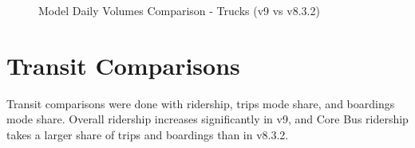 \documentclass[
  letterpaper,
  DIV=11,
  numbers=noendperiod]{scrreprt}
\begin{document}
\begin{figure}
\begin{minipage}[t]{0.33\linewidth}
{{}

}

\end{minipage}%
%
\begin{minipage}[t]{0.33\linewidth}

{\centering 


}

\end{minipage}%

\caption{\label{fig-pdf-volume-truck-comparison}Model Daily Volumes
Comparison - Trucks (v9 vs v8.3.2)}

\end{figure}

\hypertarget{transit-comparisons}{%
\section{Transit Comparisons}\label{transit-comparisons}}

Transit comparisons were done with ridership, trips mode share, and
boardings mode share. Overall ridership increases significantly in v9,
and Core Bus ridership takes a larger share of trips and boardings than
in v8.3.2.
\end{document}
